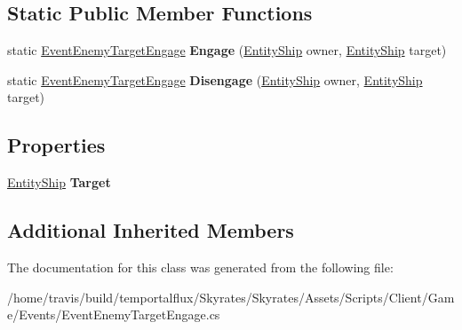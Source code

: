 \subsection*{Static Public Member Functions}
\begin{DoxyCompactItemize}
\item 
\hypertarget{class_skyrates_1_1_client_1_1_game_1_1_event_1_1_event_enemy_target_engage_a2c9a3d7e5291e50292dd3d668b1e3ed8}{static \hyperlink{class_skyrates_1_1_client_1_1_game_1_1_event_1_1_event_enemy_target_engage}{Event\-Enemy\-Target\-Engage} {\bfseries Engage} (\hyperlink{class_skyrates_1_1_common_1_1_entity_1_1_entity_ship}{Entity\-Ship} owner, \hyperlink{class_skyrates_1_1_common_1_1_entity_1_1_entity_ship}{Entity\-Ship} target)}\label{class_skyrates_1_1_client_1_1_game_1_1_event_1_1_event_enemy_target_engage_a2c9a3d7e5291e50292dd3d668b1e3ed8}

\item 
\hypertarget{class_skyrates_1_1_client_1_1_game_1_1_event_1_1_event_enemy_target_engage_a6dc1bc49d58f7857a5ff22b3bc985a0b}{static \hyperlink{class_skyrates_1_1_client_1_1_game_1_1_event_1_1_event_enemy_target_engage}{Event\-Enemy\-Target\-Engage} {\bfseries Disengage} (\hyperlink{class_skyrates_1_1_common_1_1_entity_1_1_entity_ship}{Entity\-Ship} owner, \hyperlink{class_skyrates_1_1_common_1_1_entity_1_1_entity_ship}{Entity\-Ship} target)}\label{class_skyrates_1_1_client_1_1_game_1_1_event_1_1_event_enemy_target_engage_a6dc1bc49d58f7857a5ff22b3bc985a0b}

\end{DoxyCompactItemize}
\subsection*{Properties}
\begin{DoxyCompactItemize}
\item 
\hypertarget{class_skyrates_1_1_client_1_1_game_1_1_event_1_1_event_enemy_target_engage_aaf28e68334f06b5627cf0687f4314332}{\hyperlink{class_skyrates_1_1_common_1_1_entity_1_1_entity_ship}{Entity\-Ship} {\bfseries Target}}\label{class_skyrates_1_1_client_1_1_game_1_1_event_1_1_event_enemy_target_engage_aaf28e68334f06b5627cf0687f4314332}

\end{DoxyCompactItemize}
\subsection*{Additional Inherited Members}


The documentation for this class was generated from the following file\-:\begin{DoxyCompactItemize}
\item 
/home/travis/build/temportalflux/\-Skyrates/\-Skyrates/\-Assets/\-Scripts/\-Client/\-Game/\-Events/Event\-Enemy\-Target\-Engage.\-cs\end{DoxyCompactItemize}

